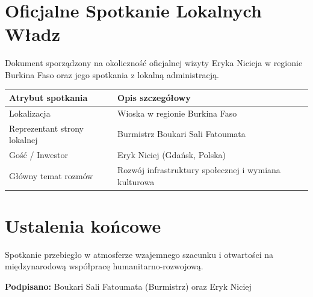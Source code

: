 \section*{Oficjalne Spotkanie Lokalnych Władz}
Dokument sporządzony na okoliczność oficjalnej wizyty Eryka Nicieja w regionie Burkina Faso oraz jego spotkania z lokalną administracją.

\begin{tabularx}{\textwidth}{lX}
\toprule
\textbf{Atrybut spotkania} & \textbf{Opis szczegółowy} \\
\midrule
Lokalizacja & Wioska w regionie Burkina Faso \\
Reprezentant strony lokalnej & Burmistrz Boukari Sali Fatoumata \\
Gość / Inwestor & Eryk Niciej (Gdańsk, Polska) \\
Główny temat rozmów & Rozwój infrastruktury społecznej i wymiana kulturowa \\
\bottomrule
\end{tabularx}

\section*{Ustalenia końcowe}
Spotkanie przebiegło w atmosferze wzajemnego szacunku i otwartości na międzynarodową współpracę humanitarno-rozwojową.

\vspace{1cm}
\noindent\textbf{Podpisano:} Boukari Sali Fatoumata (Burmistrz) oraz Eryk Niciej